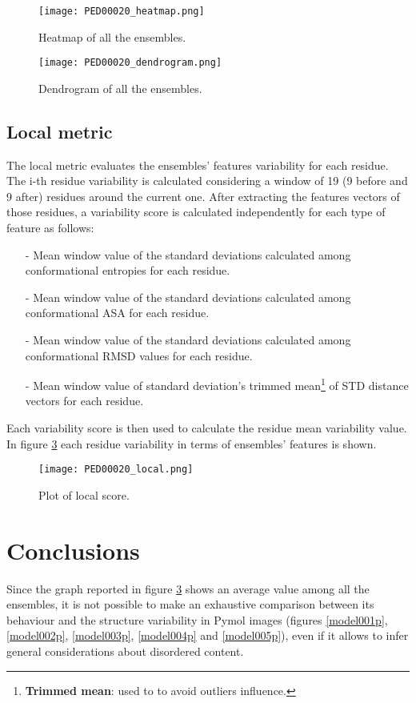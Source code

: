 \begin{figure}[H]
    \centering
	\texttt{[image: PED00020\_heatmap.png]}
	\caption{Heatmap of all the ensembles.}
	\label{heatmap}
\end{figure}
\begin{figure}[H]
    \centering
	\texttt{[image: PED00020\_dendrogram.png]}
	\caption{Dendrogram of all the ensembles.}
	\label{dendrogram}
\end{figure}


\subsection{Local metric}
The local metric evaluates the ensembles' features variability for each residue.
The i-th residue variability is calculated considering a window of 19 (9 before and 9 after) residues around the current one. After extracting the features vectors of those residues, a variability score is calculated independently for each type of feature as follows:

\begin{itemize}
\item[-] Mean window value of the standard deviations calculated among conformational entropies for each residue.
\item[-] Mean window value of the standard deviations calculated among conformational ASA for each residue.
\item[-] Mean window value of the standard deviations calculated among conformational RMSD values for each residue.
\item[-] Mean window value of standard deviation's trimmed mean\footnote{\textbf{Trimmed mean}: used to to avoid outliers influence.} of STD distance vectors for each residue.
\end{itemize}

Each variability score is then used to calculate the residue mean variability value. In figure \ref{plot} each residue variability in terms of ensembles' features is shown.

\begin{figure}[H]
    \centering
	\texttt{[image: PED00020\_local.png]}
	\caption{Plot of local score.}
	\label{plot}
\end{figure}

\newpage
\section{Conclusions}
Since the graph reported in figure \ref{plot} shows an average value among all the ensembles, it is not possible to make an exhaustive comparison between its behaviour and the structure variability in Pymol images (figures \ref{model001p}, \ref{model002p}, \ref{model003p}, \ref{model004p} and \ref{model005p}), even if it allows to infer general considerations about disordered content.

